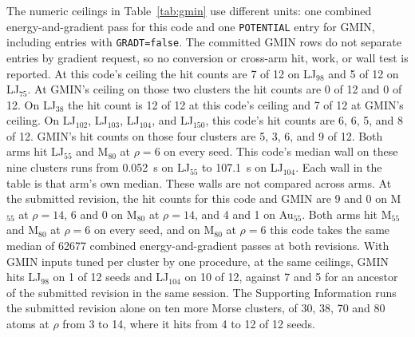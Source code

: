 \documentclass[journal=jctcce,manuscript=article]{achemso}
\begin{document}
The numeric ceilings in Table~\ref{tab:gmin} use different units: one
combined energy-and-gradient pass for this code and one
\texttt{POTENTIAL} entry for GMIN, including entries with
\texttt{GRADT=false}. The committed GMIN rows do not separate entries by
gradient request, so no conversion or cross-arm hit, work, or wall test is
reported.
At this code's ceiling the hit counts are 7 of 12 on
LJ\(_{98}\) and 5 of 12 on LJ\(_{75}\).
At GMIN's ceiling on those two clusters the hit counts are 0 of 12 and 0 of 12.
On LJ\(_{38}\) the hit count is 12 of 12 at this code's ceiling and 7 of 12 at GMIN's ceiling.
On LJ\(_{102}\), LJ\(_{103}\), LJ\(_{104}\), and LJ\(_{150}\), this code's hit
counts are 6, 6, 5, and 8 of 12.
GMIN's hit counts on those four clusters are 5, 3, 6, and 9 of 12.
Both arms hit LJ\(_{55}\) and M\(_{80}\) at \(\rho=6\) on every seed.
This code's median wall on these nine clusters runs from 0.052~s on LJ\(_{55}\) to 107.1~s on LJ\(_{104}\).
Each wall in the table is that arm's own median.
These walls are not compared across arms.
At the submitted revision, the hit counts for this code and GMIN are 9 and
0 on M\(_{55}\) at \(\rho=14\), 6 and 0 on M\(_{80}\) at \(\rho=14\),
and 4 and 1 on Au\(_{55}\).
Both arms hit M\(_{55}\) and M\(_{80}\) at \(\rho=6\) on every seed, and on
M\(_{80}\) at \(\rho=6\) this code takes the same median of 62677 combined
energy-and-gradient passes at both revisions.
With GMIN inputs tuned per cluster by one procedure, at the same ceilings,
GMIN hits LJ\(_{98}\) on 1 of 12 seeds and LJ\(_{104}\) on 10 of 12,
against 7 and 5 for an ancestor of the submitted revision in the same
session.
The Supporting Information runs the submitted revision alone on ten more Morse
clusters, of 30, 38, 70 and 80 atoms at \(\rho\) from 3 to 14, where it hits
from 4 to 12 of 12 seeds.
\end{document}
